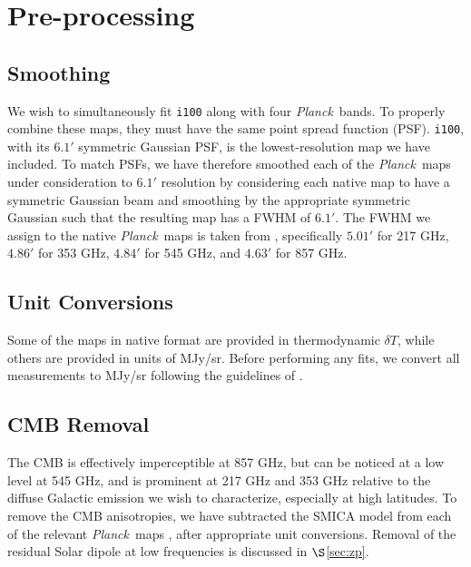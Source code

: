 \documentclass{emulateapj}
\newcommand{\PLANCK}{{\it Planck}}
\begin{document}
\section{Pre-processing}
\label{sec:prepro}

\subsection{Smoothing}
We wish to simultaneously fit \verb|i100| along with four \PLANCK~bands. To 
properly combine these maps, they must have the same point spread function 
(PSF). \verb|i100|, with its $6.1'$ symmetric Gaussian PSF, is the 
lowest-resolution map we have included. To match PSFs, we have therefore 
smoothed each of the \PLANCK~maps under consideration to $6.1'$ resolution by 
considering each native map to have a symmetric Gaussian beam and smoothing by 
the appropriate symmetric Gaussian such that the resulting map has a FWHM of 
$6.1'$. The FWHM we assign to the native \PLANCK~maps is taken from 
\cite{planckbeam}, specifically $5.01'$ for 217 GHz, $4.86'$ for 353 GHz, 
$4.84'$ for 545 GHz, and $4.63'$ for 857 GHz.

\subsection{Unit Conversions}

Some of the maps in native format are provided in thermodynamic $\delta T$, 
while others are provided in units of MJy/sr. Before performing any fits, 
we convert all measurements to MJy/sr following the guidelines of \cite{planckresponse}.


\subsection{CMB Removal}
The CMB is effectively imperceptible at 857 GHz, but can be noticed at a 
low level at 545 GHz, and is prominent at 217 GHz and 353 GHz relative 
to the diffuse Galactic emission we wish to characterize, especially at high
latitudes. To remove the CMB anisotropies, we have subtracted the SMICA model
from each of the relevant \PLANCK~maps \citep{smica}, after appropriate unit 
conversions. Removal of the residual Solar dipole at low frequencies is 
discussed in $\S$\ref{sec:zp}.
\end{document}
